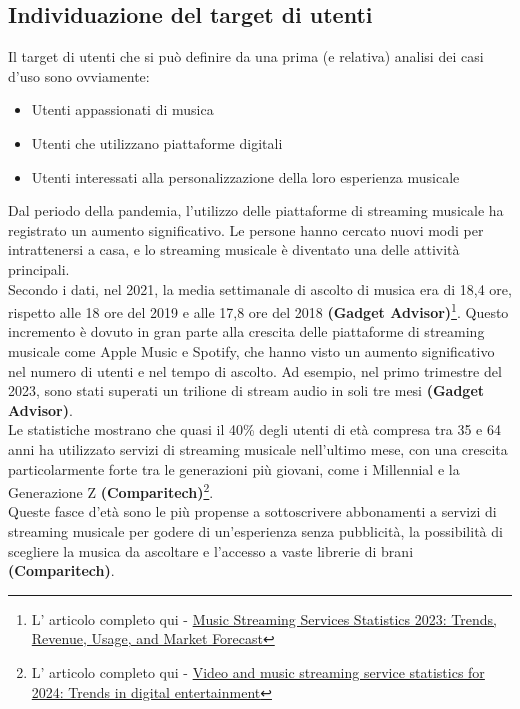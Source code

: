 \documentclass{article}
\begin{document}
		\subsection{Individuazione del target di utenti}
		Il target di utenti che si può definire da una prima (e relativa) analisi dei casi d’uso sono ovviamente:
		\begin{itemize}
			\item Utenti appassionati di musica
			\item Utenti che utilizzano piattaforme digitali
			\item Utenti interessati alla personalizzazione della loro esperienza musicale
		\end{itemize}
		Dal periodo della pandemia, l'utilizzo delle piattaforme di streaming musicale ha registrato un aumento significativo. Le persone hanno cercato nuovi modi per intrattenersi a casa, e lo streaming musicale è diventato una delle attività principali.\\
		Secondo i dati, nel 2021, la media settimanale di ascolto di musica era di 18,4 ore, rispetto alle 18 ore del 2019 e alle 17,8 ore del 2018 \textbf{(Gadget Advisor)}\footnote{L' articolo completo qui - \href{https://gadgetadvisor.com/guides/music-streaming-services-statistics-2023-trends-revenue-usage-and-market-forecast/}{Music Streaming Services Statistics 2023: Trends, Revenue, Usage, and Market Forecast}}. Questo incremento è dovuto in gran parte alla crescita delle piattaforme di streaming musicale come Apple Music e Spotify, che hanno visto un aumento significativo nel numero di utenti e nel tempo di ascolto. Ad esempio, nel primo trimestre del 2023, sono stati superati un trilione di stream audio in soli tre mesi \textbf{(Gadget Advisor)}.\\
		Le statistiche mostrano che quasi il 40\% degli utenti di età compresa tra 35 e 64 anni ha utilizzato servizi di streaming musicale nell'ultimo mese, con una crescita particolarmente forte tra le generazioni più giovani, come i Millennial e la Generazione Z \textbf{(Comparitech)}\footnote{L' articolo completo qui - \href{https://www.comparitech.com/tv-streaming/streaming-statistics/}{Video and music streaming service statistics for 2024: Trends in digital entertainment}}.\\ Queste fasce d'età sono le più propense a sottoscrivere abbonamenti a servizi di streaming musicale per godere di un'esperienza senza pubblicità, la possibilità di scegliere la musica da ascoltare e l'accesso a vaste librerie di brani \textbf{(Comparitech)}.\\
\end{document}
